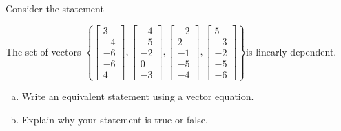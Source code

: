 
\begin{exerciseStatement}


Consider the statement 
\begin{center}\begin{minipage}{0.8\textwidth}
 The set of vectors \( \left\{ \left[\begin{array}{c}
3 \\
-4 \\
-6 \\
-6 \\
4
\end{array}\right] , \left[\begin{array}{c}
-4 \\
-5 \\
-2 \\
0 \\
-3
\end{array}\right] , \left[\begin{array}{c}
-2 \\
2 \\
-1 \\
-5 \\
-4
\end{array}\right] , \left[\begin{array}{c}
5 \\
-3 \\
-2 \\
-5 \\
-6
\end{array}\right] \right\} \)is linearly dependent.
\end{minipage}\end{center}
    


\begin{enumerate}[(a)]
\item  Write an equivalent statement using a vector equation.
\item  Explain why your statement is true or false.
\end{enumerate}
    
\end{exerciseStatement}
    
